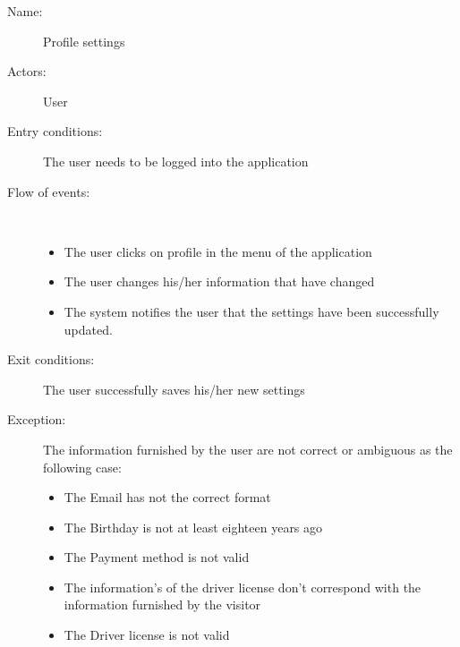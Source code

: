 \begin{description}
	\item[Name:] Profile settings
	\item[Actors:] User
	\item[Entry conditions:] The user needs to be logged into the application
	\item[Flow of events:]  \ \\
		\begin{itemize}
			\item The user clicks on profile in the menu of the application
			\item The user changes his/her information that have changed
			\item The system notifies the user that the settings have been successfully updated.
		\end{itemize}
	\item[Exit conditions:] The user successfully saves his/her new settings
	\item [Exception:] The information furnished by the user are not correct or ambiguous as the following case:
		\begin{itemize}
			\item The Email has not the correct format
			\item The Birthday is not at least eighteen years ago
			\item The Payment method is not valid
			\item The information's of the driver license don't correspond with the information furnished by the visitor
			\item The Driver license is not valid
		\end {itemize}
\end{description}
\newpage
